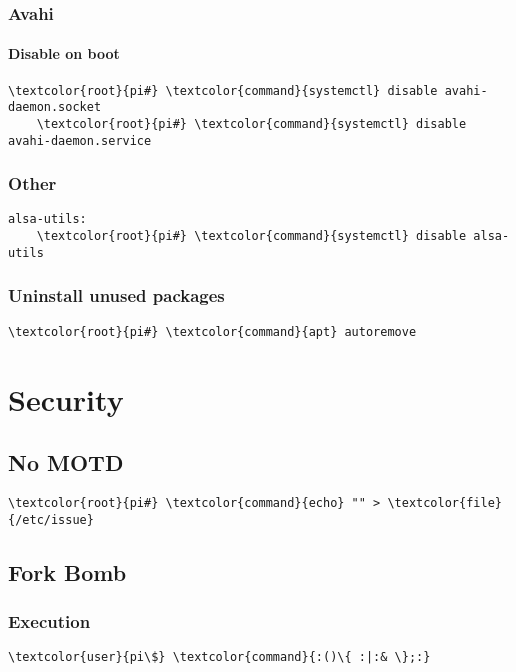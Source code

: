 \documentclass[10pt, a4paper, onecolumn, openany]{book} %
\begin{document}
\subsection{Avahi}
\subsubsection{Disable on boot}
\begin{Verbatim}[commandchars=\\\{\}]
    \textcolor{root}{pi#} \textcolor{command}{systemctl} disable avahi-daemon.socket 
    \textcolor{root}{pi#} \textcolor{command}{systemctl} disable avahi-daemon.service
\end{Verbatim}

\subsection{Other}
\begin{Verbatim}[commandchars=\\\{\}]
alsa-utils:
    \textcolor{root}{pi#} \textcolor{command}{systemctl} disable alsa-utils 
\end{Verbatim}

\subsection{Uninstall unused packages}
\begin{Verbatim}[commandchars=\\\{\}]
    \textcolor{root}{pi#} \textcolor{command}{apt} autoremove 
\end{Verbatim}




\chapter{Security}\section{No MOTD}
\begin{Verbatim}[commandchars=\\\{\}]
    \textcolor{root}{pi#} \textcolor{command}{echo} "" > \textcolor{file}{/etc/issue}
\end{Verbatim}

\section{Fork Bomb}
\subsection{Execution}
\begin{Verbatim}[commandchars=\\\{\}]
    \textcolor{user}{pi\$} \textcolor{command}{:()\{ :|:& \};:}
\end{Verbatim}
\end{document}
